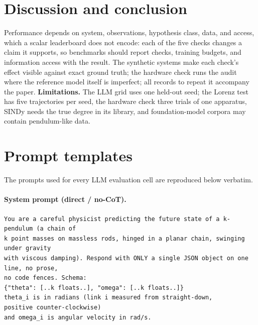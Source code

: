 \documentclass{article}
\begin{document}
\section{Discussion and conclusion}
Performance depends on system, observations, hypothesis class, data, and access, which a
scalar leaderboard does not encode: each of the five checks changes a claim it supports, so
benchmarks should report checks, training budgets, and information access with
the result. The synthetic systems make each check's effect
visible against exact ground truth; the hardware check runs the audit where the reference
model itself is imperfect; all records to repeat it accompany the paper.
\textbf{Limitations.}\label{sec:limitations} The LLM grid uses one held-out seed; the Lorenz
test has five trajectories per seed, the hardware check three trials of one apparatus, SINDy
needs the true degree in its library, and foundation-model corpora may contain pendulum-like
data.

%
%

\small



\appendix
\section{Prompt templates}
The prompts used for every LLM evaluation cell are reproduced below verbatim.

\paragraph{System prompt (direct / no-CoT).}
\begin{small}\begin{verbatim}
You are a careful physicist predicting the future state of a k-pendulum (a chain of
k point masses on massless rods, hinged in a planar chain, swinging under gravity
with viscous damping). Respond with ONLY a single JSON object on one line, no prose,
no code fences. Schema:
{"theta": [..k floats..], "omega": [..k floats..]}
theta_i is in radians (link i measured from straight-down,
positive counter-clockwise)
and omega_i is angular velocity in rad/s.
\end{verbatim}\end{small}
\end{document}
